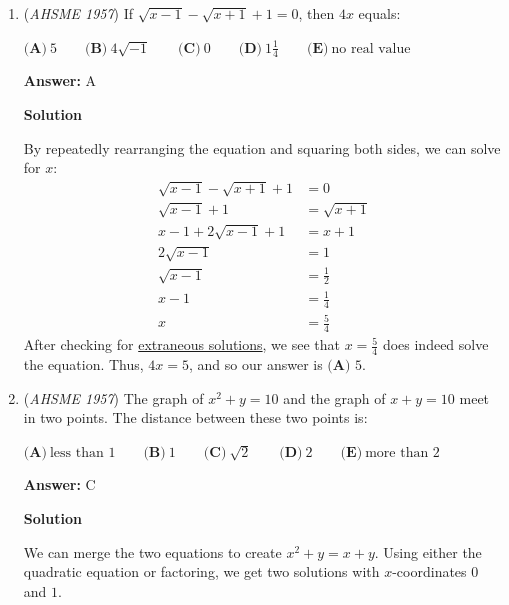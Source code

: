 \begin{enumerate}
 (2) is the converse

 (3) is the \href{https://artofproblemsolving.com/wiki/index.php?title=Contrapositive}{contrapositive}

 (4) is a restatement of the original theorem.

 Therefore, (3) and (4) are correct. $\boxed{\textbf{(E) } 3, 4}$



	\item (\textit{AHSME 1957}) If $\sqrt{x - 1} - \sqrt{x + 1} + 1 = 0$, then $4x$ equals: 


 $\textbf{(A)}\ 5 \qquad \textbf{(B)}\ 4\sqrt{-1}\qquad \textbf{(C)}\ 0\qquad \textbf{(D)}\ 1\frac{1}{4}\qquad \textbf{(E)}\ \text{no real value}$

 \textbf{Answer: }A



\textbf{Solution}

By repeatedly rearranging the equation and squaring both sides, we can solve for $x$:\begin{align*}\sqrt{x-1}-\sqrt{x+1}+1 &= 0 \\\sqrt{x-1}+1 &= \sqrt{x+1} \\x-1+2\sqrt{x-1}+1 &= x+1 \\2\sqrt{x-1} &= 1 \\\sqrt{x-1} &= \frac{1}{2} \\x-1 &= \frac{1}{4} \\x &= \frac{5}{4}\end{align*}
After checking for \href{https://artofproblemsolving.com/wiki/index.php?title=Extraneous\_solutions}{extraneous solutions}, we see that $x=\frac{5}{4}$ does indeed solve the equation. Thus, $4x=5$, and so our answer is $\boxed{\textbf{(A) }5}$.

 


	\item (\textit{AHSME 1957}) The graph of $x^2 + y = 10$ and the graph of $x + y = 10$ meet in two points. The distance between these two points is: 


 $\textbf{(A)}\ \text{less than 1} \qquad \textbf{(B)}\ 1\qquad \textbf{(C)}\ \sqrt{2}\qquad \textbf{(D)}\ 2\qquad\textbf{(E)}\ \text{more than 2}$

 \textbf{Answer: }C



\textbf{Solution}

We can merge the two equations to create $x^2+y=x+y$. Using either the quadratic equation or factoring, we get two solutions with $x$-coordinates $0$ and $1$.


\end{enumerate}
